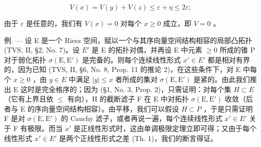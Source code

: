 \[
V (x) = V (y) + V (z) \leqslant \varepsilon + \eta \leqslant 2 \varepsilon ;
\]

由于 \(\varepsilon\) 是任意的，我们有 \(V(x) = 0\) 对每个 \(x \geqslant 0\) 成立，即 \(V = 0\) 。

例. --- 设 E 是一个 Riesz 空间，赋以一个与其序向量空间结构相容的局部凸拓扑 (TVS, II, §2, No. 7)。设 \(E'\) 是 E 的拓扑对偶，并再设 E 中元素 \(\geqslant 0\) 所成的锥 P 对于弱化拓扑 \(\sigma(\mathrm{E},\mathrm{E}')\) 是完备的。则每个连续线性形式 \(x' \in E'\) 都是相对有界的，因为已知 (TVS, II, §6, No. 8, Prop. 11 的推论 2)，在这些条件下，对 E 中每个 \(x \geqslant 0\) ，由 \(y \in E\) 中满足 \(|y| \leqslant x\) 者所成的集对 \(\sigma(\mathrm{E},\mathrm{E}')\) 是紧的。由此我们推出 E 这时是完全格序的；因为 (§1, No. 3, Prop. 2)，只需证明：对每个集 \(H \subset E\) （它有上界且依 \(\leqslant\) 有向），H 的截断滤子 F 在 E 中对拓扑 \(\sigma(\mathrm{E},\mathrm{E}')\) 收敛（后者与 E 的序向量空间结构相容）。由平移，我们可以假设 \(H \subset P\) ，于是只需证明 F 是对 \(\sigma(\mathrm{E},\mathrm{E}')\) 的 Cauchy 滤子，或者再说一遍，每个连续线性形式 \(x' \in E'\) 关于 F 有极限。而当 \(x'\) 是正线性形式时，这由单调极限定理立即可得；又由于每个线性形式 \(x' \in E'\) 是两个正线性形式之差 (Th. 1)，我们的断言得证。
